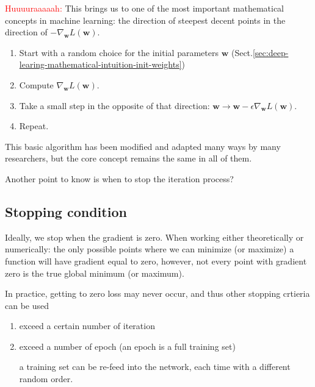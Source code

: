 \textcolor{red}{Huuuuraaaaah: } This brings us to one of the most important
mathematical concepts in machine learning: the direction of steepest decent
points in the direction of $-\nabla_{\mathbf{w}}L(\mathbf{w})$.

\begin{mdframed}

\begin{enumerate}
  \item  Start with a random choice for the initial parameters $\mathbf{w}$ (Sect.\ref{sec:deep-learing-mathematical-intuition-init-weights})

  \item  Compute $\nabla_{\mathbf{w}} L(\mathbf{w})$.
  
  \item Take a small step in the opposite of that direction: $\mathbf{w} \rightarrow \mathbf{w} - \epsilon\nabla_{\mathbf{w}} L(\mathbf{w})$.

  \item Repeat.

\end{enumerate}
This basic algorithm has been modified and adapted many ways by many researchers, but the core concept remains the same in all of them.
\end{mdframed}

Another point to know is when to stop the iteration process?

\subsection{Stopping condition}

Ideally, we stop when the gradient is zero.
When working either theoretically or numerically: the only possible points where
we can minimize (or maximize) a function will have gradient equal to zero,
however, not every point with gradient zero is the true global minimum (or
maximum).

In practice, getting to zero loss may never occur, and thus other stopping crtieria can be used
\begin{enumerate}
  \item exceed a certain number of iteration
  
  \item exceed a number of epoch (an epoch is a full training set)
  
  a training set can be re-feed into the network, each time with a different random order.
\end{enumerate}

